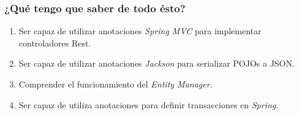 \documentclass[handout,a4paper,slidestop,xcolor=pst,blue]{beamer}
\begin{document}
\begin{frame}[c]
    \frametitle{¿Qué tengo que saber de todo ésto?}
    \begin{enumerate}[<+->]
        \item Ser capaz de utilizar anotaciones \emph{Spring MVC} para implementar controladores Rest.
        \item Ser capaz de utilizar anotaciones \emph{Jackson} para serializar POJOs a JSON.
        \item Comprender el funcionamiento del \emph{Entity Manager}.
        \item Ser capaz de utiliza anotaciones para definir transacciones en \emph{Spring}.
    \end{enumerate}
\end{frame}
\end{document}

